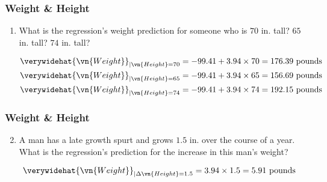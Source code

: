 \begin{frame}
\frametitle{Weight \& Height}
\ask

\begin{enumerate}\setcounter{enumi}{0}

\item What is the regression's weight prediction for someone who is $70$ in. tall? $65$ in. tall? $74$ in. tall?

\begin{answer}
\begin{align*}
\verywidehat{\vn{Weight}}_{|\vn{Height}=70}
    & = -99.41 + 3.94 \times 70 
      = 176.39 ~\text{pounds}\\
\verywidehat{\vn{Weight}}_{|\vn{Height}=65}
    & = -99.41 + 3.94 \times 65 
      = 156.69 ~\text{pounds}\\
\verywidehat{\vn{Weight}}_{|\vn{Height}=74}
    & = -99.41 + 3.94 \times 74 
      = 192.15 ~\text{pounds}
\end{align*}
\end{answer}

\end{enumerate}
\end{frame}


\begin{frame}
\frametitle{Weight \& Height}
\ask

\begin{enumerate}\setcounter{enumi}{1}

\item A man has a late growth spurt and grows $1.5$ in. over the course of a year. What is the regression's prediction for the increase in this man's weight?

\begin{answer}
\begin{align*}
\verywidehat{\vn{Weight}}_{|\Delta \vn{Height}=1.5}
    & = 3.94 \times 1.5
      = 5.91 ~\text{pounds}
\end{align*}
\end{answer}

\end{enumerate}
\end{frame}


